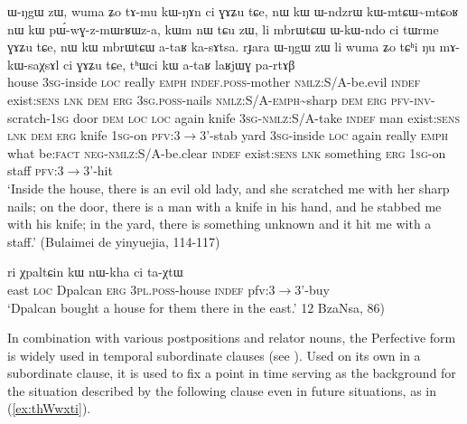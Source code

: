 \documentclass[oldfontcommands,oneside,a4paper,11pt]{article}
\newcommand{\ipa}[1]{{\phon \mbox{#1}}} %
\newcommand{\refb}[1]{(\ref{#1})}
\newcommand{\rdp}{\textasciitilde{}}
\begin{document}
\begin{exe}
\ex \label{ex:bulaimei}
\gll \ipa{kʰa}	\ipa{ɯ-ŋgɯ}	\ipa{zɯ,}	\ipa{wuma}	\ipa{ʑo}	\ipa{tɤ-mu}	\ipa{kɯ-ŋɤn}	\ipa{ci}	\ipa{ɣɤʑu}	\ipa{tɕe,} \ipa{nɯ}	\ipa{kɯ}	\ipa{ɯ-ndzrɯ}	\ipa{kɯ-mtɕɯ\rdp{}mtɕoʁ}	\ipa{nɯ}	\ipa{kɯ}	\ipa{pɯ́-wɣ-z-mɯrʁɯz-a,} \ipa{kɯm}	\ipa{nɯ} \ipa{tɕu}	\ipa{zɯ,}	\ipa{li}	\ipa{mbrɯtɕɯ}	\ipa{ɯ-kɯ-ndo}	\ipa{ci}	\ipa{tɯrme}	\ipa{ɣɤʑu}	\ipa{tɕe,}	\ipa{nɯ}	\ipa{kɯ}	\ipa{mbrɯtɕɯ}	\ipa{a-taʁ}	\ipa{ka-sɤtsa.}  \ipa{rɟara}	\ipa{ɯ-ŋgɯ}	\ipa{zɯ}	\ipa{li}	\ipa{wuma}	\ipa{ʑo}	\ipa{tɕʰi}	\ipa{ŋu}	\ipa{mɤ-kɯ-saχsɤl}	\ipa{ci}	\ipa{ɣɤʑu}	\ipa{tɕe,}	\ipa{tʰɯci}	\ipa{kɯ}	\ipa{a-taʁ}	\ipa{laʁjɯɣ}	\ipa{pa-rtɤβ} \\
house \textsc{3sg}-inside \textsc{loc} really \textsc{emph} \textsc{indef.poss}-mother \textsc{nmlz}:S/A-be.evil \textsc{indef} exist:\textsc{sens} \textsc{lnk} \textsc{dem} \textsc{erg} \textsc{3sg.poss}-nails \textsc{nmlz}:S/A-\textsc{emph}\rdp{}sharp \textsc{dem} \textsc{erg} \textsc{pfv-inv}-scratch-\textsc{1sg} door \textsc{dem} \textsc{loc}  \textsc{loc} again knife \textsc{3sg-nmlz}:S/A-take \textsc{indef} man exist:\textsc{sens} \textsc{lnk} \textsc{dem} \textsc{erg} knife \textsc{1sg}-on \textsc{pfv}:3$\rightarrow$3'-stab yard \textsc{3sg}-inside \textsc{loc} again really \textsc{emph} what be:\textsc{fact} \textsc{neg-nmlz}:S/A-be.clear \textsc{indef} exist:\textsc{sens} \textsc{lnk} something \textsc{erg}  \textsc{1sg}-on staff \textsc{pfv}:3$\rightarrow$3'-hit \\
\glt `Inside the house, there is an evil old lady, and she scratched me with her sharp nails; on the door, there is a man with a knife in his hand, and he stabbed me with his knife; in the yard, there is something unknown and it hit me with a staff.'  (Bulaimei de yinyuejia, 114-117)
\end{exe}


\begin{exe}
\ex \label{ex:taXtW}
\gll \ipa{akɯ} 	\ipa{ri} 	\ipa{χpaltɕin} 	\ipa{kɯ} 	\ipa{nɯ-kha} 	\ipa{ci} 	\ipa{ta-χtɯ} \\
east \textsc{loc} Dpalcan \textsc{erg} \textsc{3pl.poss}-house \textsc{indef} pfv:3$\rightarrow$3'-buy \\
\glt `Dpalcan bought a house for them there in the east.' 12 BzaNsa, 86)
\end{exe}

In combination with various postpositions and relator nouns, the Perfective form is widely used in temporal subordinate clauses (see \citealt[284-93]{jacques14linking}). Used on its own in a subordinate clause, it is used to fix a point in time serving as the background for the situation described by the following clause even in future situations, as in \refb{ex:thWwxti}.
\end{document}
